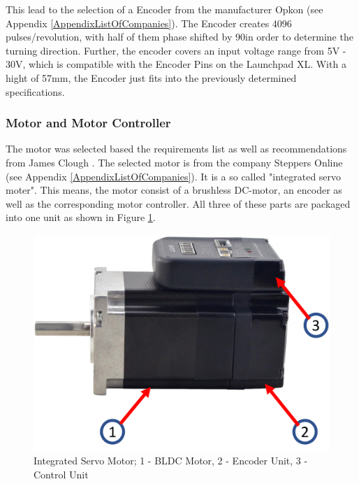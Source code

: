 This lead to the selection of a Encoder from the manufacturer Opkon (see Appendix \ref{AppendixListOfCompanies}). The Encoder creates 4096 pulses/revolution, with half of them phase shifted by 90\degree in order to determine the turning direction. Further, the encoder covers an input voltage range from 5V - 30V, which is compatible with the Encoder Pins on the Launchpad XL. With a hight of 57mm, the Encoder just fits into the previously determined specifications.

\subsubsection{Motor and Motor Controller}
The motor was selected based the requirements list as well as recommendations from James Clough \cite{CloughELS}. The selected motor is from the company Steppers Online (see Appendix \ref{AppendixListOfCompanies}). It is a so called "integrated servo moter". This means, the motor consist of a brushless DC-motor, an encoder as well as the corresponding motor controller. All three of these parts are packaged into one unit as shown in Figure \ref{Integrated Servo Motor}.\\

\begin{figure}
    \begin{center}
    \includegraphics[width=12cm]{Pictures/IntegratedServo.png}
    \caption[Integrated Servo Motor]{Integrated Servo Motor; 1 - BLDC Motor, 2 - Encoder Unit, 3 - Control Unit}
    \label{Integrated Servo Motor}
    \end{center}
\end{figure}

